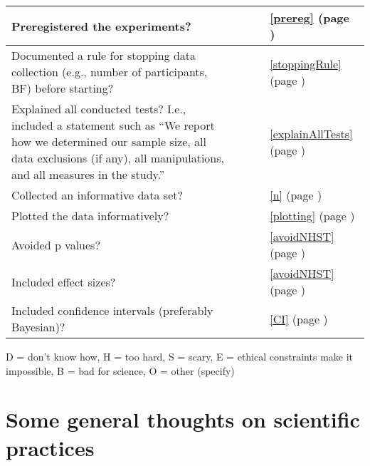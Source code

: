 \documentclass[letterpaper,oneside,11pt,article, portrait]{memoir}
\begin{document}
\begin{table}[t]
\begin{tabular}{| p{3.5in} | c | c | c | l |}
Preregistered the experiments?	& & & & \ref{prereg} (page \pageref{prereg}) \\ \hline

Documented a rule for stopping data collection (e.g., number of participants, BF) before starting?	& & & & \ref{stoppingRule} (page \pageref{stoppingRule}) \\ \hline

Explained all conducted tests? I.e., included a statement such as ``We report how we determined our sample size, all data exclusions (if any), all manipulations, and all measures in the study.''	& & & & \ref{explainAllTests} (page \pageref{explainAllTests})  \\ \hline

Collected an informative data set? & & & & \ref{n} (page \pageref{n}) \\ \hline

Plotted the data informatively? & & & & \ref{plotting} (page \pageref{plotting}) \\ \hline

Avoided p values?	& & & & \ref{avoidNHST} (page \pageref{avoidNHST})  \\ \hline

Included effect sizes? 	& & & & \ref{avoidNHST} (page \pageref{avoidNHST})  \\ \hline

Included confidence intervals (preferably Bayesian)? & & & & \ref{CI} (page \pageref{CI}) \\ \hline

\end{tabular}

{\scriptsize * D = don't know how, H = too hard, S = scary, E = ethical constraints make it impossible, B = bad for science, O = other (specify)}

\end{table}


\clearpage


\pagestyle{footer}



\chapter{Some general thoughts on scientific practices} \label{general}
\end{document}
